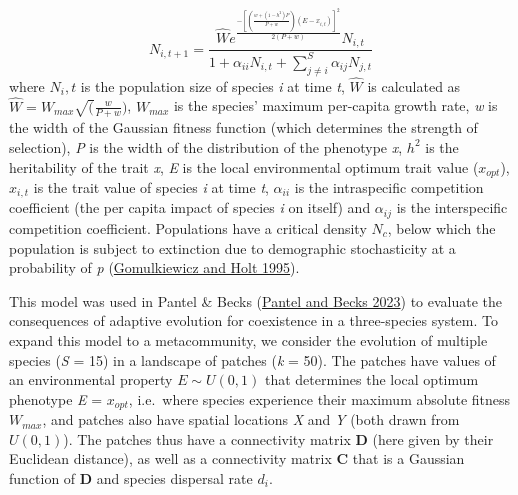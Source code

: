 \documentclass[
]{article}
\begin{document}
\[ N_{i,t+1} =\frac{\hat{W}e^ \frac{-[(\frac{w+(1-h^2)P} {P+w})(E-x_{i,t})]^2}{2(P+w)}N_{i,t}} {1 + \alpha_{ii}N_{i,t} + \sum_{j \neq i}^{S} \alpha_{ij}N_{j,t}} \] where \(N_i,t\) is the population size of species \emph{i} at time \emph{t}, \(\hat{W}\) is calculated as \(\hat{W}=W_{max}\sqrt(\frac{w}{P+w})\), \(W_{max}\) is the species' maximum per-capita growth rate, \emph{w} is the width of the Gaussian fitness function (which determines the strength of selection), \emph{P} is the width of the distribution of the phenotype \emph{x}, \(h^2\) is the heritability of the trait \emph{x}, \emph{E} is the local environmental optimum trait value (\(x_{opt}\)), \(x_{i,t}\) is the trait value of species \emph{i} at time \emph{t}, \(\alpha_{ii}\) is the intraspecific competition coefficient (the per capita impact of species \emph{i} on itself) and \(\alpha_{ij}\) is the interspecific competition coefficient. Populations have a critical density \(N_c\), below which the population is subject to extinction due to demographic stochasticity at a probability of \emph{p} (\protect\hyperlink{ref-Gomulkiewicz1995}{Gomulkiewicz and Holt 1995}).

This model was used in Pantel \& Becks (\protect\hyperlink{ref-Pantel2023}{Pantel and Becks 2023}) to evaluate the consequences of adaptive evolution for coexistence in a three-species system. To expand this model to a metacommunity, we consider the evolution of multiple species (\emph{S} = 15) in a landscape of patches (\emph{k} = 50). The patches have values of an environmental property \(E \sim U(0,1)\) that determines the local optimum phenotype \emph{E} = \(x_{opt}\), i.e.~where species experience their maximum absolute fitness \(W_{max}\), and patches also have spatial locations \emph{X} and \emph{Y} (both drawn from \(U(0, 1)\)). The patches thus have a connectivity matrix \textbf{D} (here given by their Euclidean distance), as well as a connectivity matrix \textbf{C} that is a Gaussian function of \textbf{D} and species dispersal rate \(d_i\).
\end{document}
